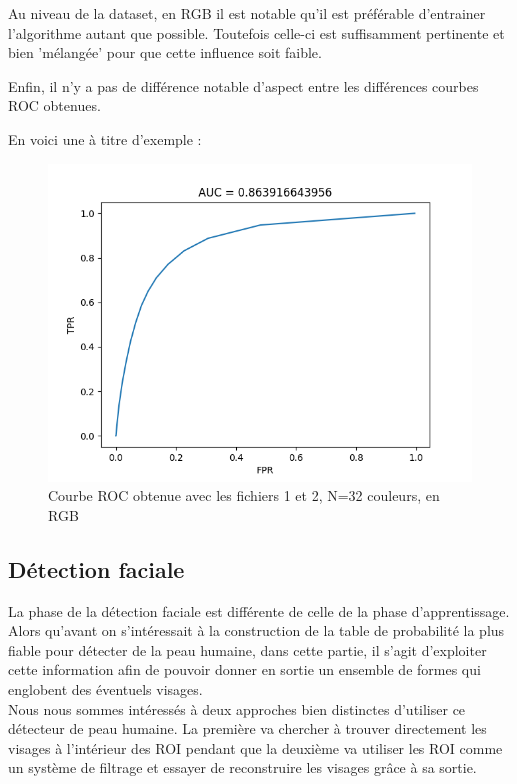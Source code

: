 \documentclass[a4paper,11pt]{article}
\begin{document}
Au niveau de la dataset, en RGB il est notable qu'il est préférable d'entrainer l'algorithme autant que possible. Toutefois celle-ci est suffisamment pertinente et bien 'mélangée' pour que cette influence soit faible.

Enfin, il n'y a pas de différence notable d'aspect entre les différences courbes ROC obtenues.

En voici une à titre d'exemple :

\begin{figure}[H]
\begin{center}
    \includegraphics[scale=0.5]{ROC_8_RGB.png}
    \caption{Courbe ROC obtenue avec les fichiers 1 et 2, N=32 couleurs, en RGB}
\end{center}
\end{figure}

\subsection{Détection faciale}

La phase de la détection faciale est différente de celle de la phase d'apprentissage. 
Alors qu'avant on s'intéressait à la construction de la table de probabilité la plus fiable pour détecter de la peau humaine, dans cette partie, il s'agit d'exploiter cette information afin de pouvoir donner en sortie un ensemble de formes qui englobent des éventuels visages.\\
\newline
Nous nous sommes intéressés à deux approches bien distinctes d'utiliser ce \og détecteur de peau humaine\fg{}. 
La première va chercher à trouver directement les visages à l'intérieur des ROI pendant que la deuxième va utiliser les ROI comme un système de filtrage et essayer de reconstruire les visages grâce à sa sortie.
\newline
\end{document}
